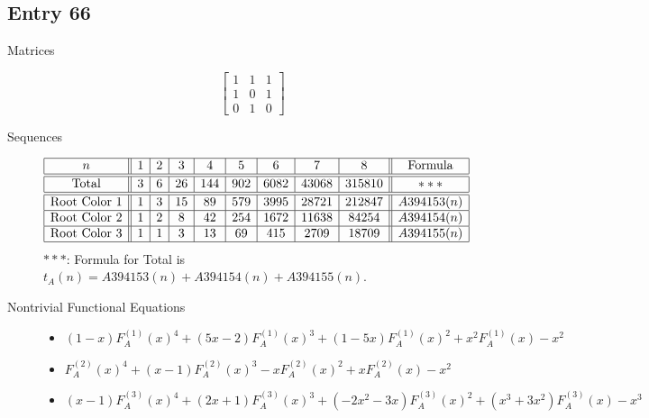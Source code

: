 \documentclass[12pt]{amsart}
\newcommand{\gff}[2]{F_{#2}^{(#1)}(x)}
\newcommand{\gfa}[1]{\gff{#1}{A}}
\begin{document}
\subsection*{Entry 66}
\begin{description}
    \item[Matrices]
    
    \[\begin{bmatrix}
1 & 1 & 1 \\
1 & 0 & 1 \\
0 & 1 & 0
\end{bmatrix}\]
    \item[Sequences]\hspace*{\fill}\vspace{-0.5cm}
    \begin{center}
        \[
        \begin{array}{|c||c|c|c|c|c|c|c|c||c|}\hline
           n  & 1 & 2 & 3 & 4 & 5 & 6 & 7 & 8  & \text{Formula}\\\hline\hline
           \text{Total}  & 3 & 6 & 26 & 144 & 902 & 6082 & 43068 & 315810 & *** \\\hline\hline
           \text{Root Color }1 & 1 & 3 & 15 & 89 & 579 & 3995 & 28721 & 212847 & A394153(n) \\\hline
           \text{Root Color }2 & 1 & 2 & 8 & 42 & 254 & 1672 & 11638 & 84254 & A394154(n) \\\hline
           \text{Root Color }3 & 1 & 1 & 3 & 13 & 69 & 415 & 2709 & 18709 & A394155(n) \\\hline
        \end{array}
        \]
        $***$: Formula for Total is $t_A(n)=A394153(n)+A394154(n)+A394155(n)$.
    \end{center}
    
    \item[Nontrivial Functional Equations]\hspace*{\fill}

    \begin{itemize}
\item $(1 - x)\gfa{1}^4+(5x - 2)\gfa{1}^3+(1 - 5x)\gfa{1}^2+x^2\gfa{1}-x^2$

\item $\gfa{2}^4+(x - 1)\gfa{2}^3-x\gfa{2}^2+x\gfa{2}-x^2$


\item $(x - 1)\gfa{3}^4+(2x + 1)\gfa{3}^3+(-2x^2 - 3x)\gfa{3}^2+(x^3 + 3x^2)\gfa{3}-x^3$


\end{itemize}
    
\end{description}
\end{document}
